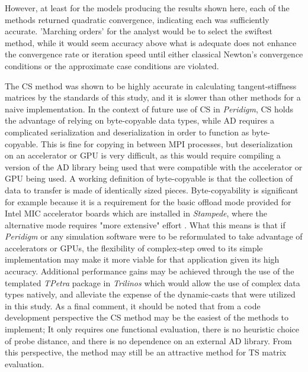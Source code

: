 \documentclass[preprint,12pt]{elsarticle}
\begin{document}
However, at least for the models producing the results shown here, each of the
methods returned quadratic convergence, indicating each was sufficiently
accurate. 'Marching orders' for the analyst would be to select the swiftest
method, while it would seem accuracy above what is adequate does not enhance
the convergence rate or iteration speed until either classical Newton's convergence
conditions or the approximate case conditions are violated. 

The CS method was shown to be highly accurate in calculating tangent-stiffness
matrices by the standards of this study, and it is slower than other methods
for a naive implementation. In the context of future use of CS in
\emph{Peridigm}, CS holds the advantage of relying on byte-copyable data types,
while AD requires a complicated serialization and deserialization in order to
function as byte-copyable. This is fine for copying in between MPI processes,
but deserialization on an accelerator or GPU is very difficult, as this would
require compiling a version of the AD library being used that were compatible
with the accelerator or GPU being used. A working definition of byte-copyable
is that the collection of data to transfer is made of identically sized pieces.
Byte-copyability is significant for example because it is a requirement for the
basic offload mode provided for Intel MIC accelerator boards which are
installed in \emph{Stampede}, where the alternative mode requires "more
extensive" effort \cite{intel_byte_copyable}. What this means is that if
\emph{Peridigm} or any simulation software were to be reformulated to take
advantage of accelerators or GPUs, the flexibility of complex-step owed to its
simple implementation may make it more viable for that application given its
high accuracy. Additional performance gains may be achieved through the use of
the templated \emph{TPetra} package in \emph{Trilinos} which would allow the
use of complex data types natively, and alleviate the expense of the
dynamic-casts that were utilized in this study.  As a final comment, it should
be noted that from a code development perspective the CS method may be the
easiest of the methods to implement; It only requires one functional
evaluation, there is no heuristic choice of probe distance, and there is no
dependence on an external AD library.  From this perspective, the method may
still be an attractive method for TS matrix evaluation.  
\end{document}
